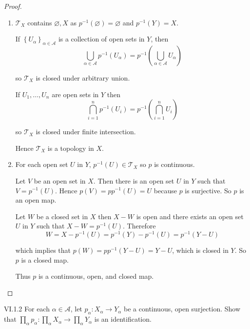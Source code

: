 \begin{proof}
	\begin{enumerate}[label={(\alph*)}]
		\item \( \mathscr{T}_{X} \) contains \( \varnothing, X \) as \( p^{-1}(\varnothing) = \varnothing \) and \( p^{-1}(Y) = X \).

		      If \( {\left\{ U_{\alpha} \right\}}_{\alpha\in\mathscr{A}} \) is a collection of open sets in \( Y \), then
		      \[
			      \bigcup_{\alpha\in\mathscr{A}} p^{-1}(U_{\alpha}) = p^{-1}\left(\bigcup_{\alpha\in\mathscr{A}} U_{\alpha}\right)
		      \]

		      so \( \mathscr{T}_{X} \) is closed under arbitrary union.

		      If \( U_{1}, \ldots, U_{n} \) are open sets in \( Y \) then
		      \[
			      \bigcap^{n}_{i=1} p^{-1}(U_{i}) = p^{-1}\left(\bigcap^{n}_{i=1} U_{i}\right)
		      \]

		      so \( \mathscr{T}_{X} \) is closed under finite intersection.

		      Hence \( \mathscr{T}_{X} \) is a topology in \( X \).
		\item For each open set \( U \) in \( Y \), \( p^{-1}(U) \in \mathscr{T}_{X} \) so \( p \) is continuous.

		      Let \( V \) be an open set in \( X \). Then there is an open set \( U \) in \( Y \) such that \( V = p^{-1}(U) \). Hence \( p(V) = pp^{-1}(U) = U \) because \( p \) is surjective. So \( p \) is an open map.

		      Let \( W \) be a closed set in \( X \) then \( X - W \) is open and there exists an open set \( U \) in \( Y \) such that \( X - W = p^{-1}(U) \). Therefore
		      \[
			      W = X - p^{-1}(U) = p^{-1}(Y) - p^{-1}(U) = p^{-1}(Y - U)
		      \]

		      which implies that \( p(W) = pp^{-1}(Y - U) = Y - U \), which is closed in \( Y \). So \( p \) is a closed map.

		      Thus \( p \) is a continuous, open, and closed map.
	\end{enumerate}
\end{proof}

\begin{problem}{VI.1.2}\label{problem:VI.1.2}
For each \( \alpha \in \mathscr{A} \), let \( p_{\alpha}: X_{\alpha} \to Y_{\alpha} \) be a continuous, open surjection. Show that \( \prod_{\alpha} p_{\alpha}: \prod_{\alpha} X_{\alpha} \to \prod_{\alpha} Y_{\alpha} \) is an identification.
\end{problem}

